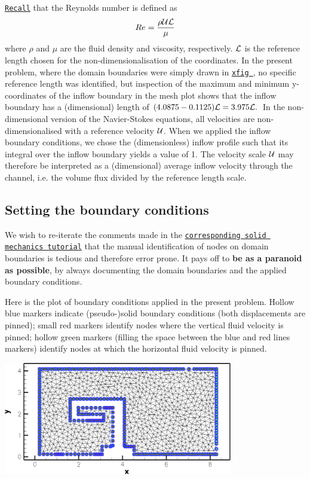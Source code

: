 \href{../../driven_cavity/html/index.html#equation}{\tt Recall} that the Reynolds number is defined as \[ Re = \frac{\rho {\cal U} {\cal L}}{\mu} \] where $ \rho $ and $ \mu $ are the fluid density and viscosity, respectively. $ {\cal L} $ is the reference length chosen for the non-\/dimensionalisation of the coordinates. In the present problem, where the domain boundaries were simply drawn in \href{http://en.wikipedia.org/wiki/Xfig}{\tt xfig }, no specific reference length was identified, but inspection of the maximum and minimum y-\/coordinates of the inflow boundary in the mesh plot shows that the inflow boundary has a (dimensional) length of $ (4.0875 - 0.1125) {\cal L} = 3.975 {\cal L}. $ In the non-\/dimensional version of the Navier-\/\+Stokes equations, all velocities are non-\/dimensionalised with a reference velocity $ {\cal U} $. When we applied the inflow boundary conditions, we chose the (dimensionless) inflow profile such that its integral over the inflow boundary yields a value of 1. The velocity scale $ {\cal U} $ may therefore be interpreted as a (dimensional) average inflow velocity through the channel, i.\+e. the volume flux divided by the reference length scale.



\hypertarget{index_bound}{}\subsection{Setting the boundary conditions}\label{index_bound}
We wish to re-\/iterate the comments made in the \href{../../../solid/unstructured_solid/html/index.html#comm_ex}{\tt corresponding solid mechanics tutorial} that the manual identification of nodes on domain boundaries is tedious and therefore error prone. It pays off to {\bfseries be as a paranoid as possible}, by always documenting the domain boundaries and the applied boundary conditions.

Here is the plot of boundary conditions applied in the present problem. Hollow blue markers indicate (pseudo-\/)solid boundary conditions (both displacements are pinned); small red markers identify nodes where the vertical fluid velocity is pinned; hollow green markers (filling the space between the blue and red lines markers) identify nodes at which the horizontal fluid velocity is pinned.

 
\begin{DoxyImage}
\includegraphics[width=0.75\textwidth]{bcs}
\end{DoxyImage}


